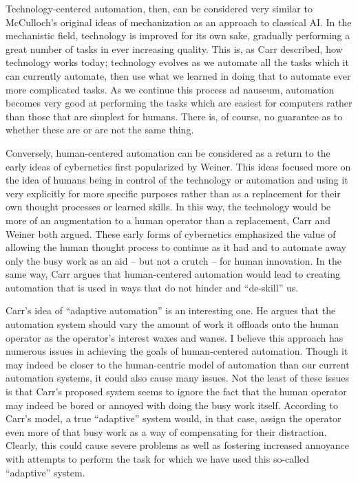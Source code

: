\documentclass[12pt]{article}
\begin{document}
Technology-centered automation, then, can be considered very similar to McCulloch's original ideas of mechanization as an approach to classical AI. In the mechanistic field, technology is improved for its own sake, gradually performing a great number of tasks in ever increasing quality. This is, as Carr described, how technology works today; technology evolves as we automate all the tasks which it can currently automate, then use what we learned in doing that to automate ever more complicated tasks. As we continue this process ad nauseum, automation becomes very good at performing the tasks which are easiest for computers rather than those that are simplest for humans. There is, of course, no guarantee as to whether these are or are not the same thing.

Conversely, human-centered automation can be considered as a return to the early ideas of cybernetics first popularized by Weiner. This ideas focused more on the idea of humans being in control of the technology or automation and using it very explicitly for more specific purposes rather than as a replacement for their own thought processes or learned skills. In this way, the technology would be more of an augmentation to a human operator than a replacement, Carr and Weiner both argued. These early forms of cybernetics emphasized the value of allowing the human thought process to continue as it had and to automate away only the busy work as an aid -- but not a crutch -- for human innovation. In the same way, Carr argues that human-centered automation would lead to creating automation that is used in ways that do not hinder and ``de-skill'' us.

Carr's idea of ``adaptive automation'' is an interesting one. He argues that the automation system should vary the amount of work it offloads onto the human operator as the operator's interest waxes and wanes. I believe this approach has numerous issues in achieving the goals of human-centered automation. Though it may indeed be closer to the human-centric model of automation than our current automation systems, it could also cause many issues. Not the least of these issues is that Carr's proposed system seems to ignore the fact that the human operator may indeed be bored or annoyed with doing the busy work itself. According to Carr's model, a true ``adaptive'' system would, in that case, assign the operator even more of that busy work as a way of compensating for their distraction. Clearly, this could cause severe problems as well as fostering increased annoyance with attempts to perform the task for which we have used this so-called ``adaptive'' system.
\end{document}
